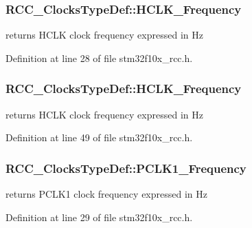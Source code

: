 \subsubsection[{\texorpdfstring{H\+C\+L\+K\+\_\+\+Frequency}{HCLK_Frequency}}]{ R\+C\+C\+\_\+\+Clocks\+Type\+Def\+::\+H\+C\+L\+K\+\_\+\+Frequency}\hypertarget{struct_r_c_c___clocks_type_def_afd09fa4f2e7da560accb159fab2c421b}{}\label{struct_r_c_c___clocks_type_def_afd09fa4f2e7da560accb159fab2c421b}
returns H\+C\+LK clock frequency expressed in Hz 

Definition at line 28 of file stm32f10x\+\_\+rcc.\+h.

\subsubsection[{\texorpdfstring{H\+C\+L\+K\+\_\+\+Frequency}{HCLK_Frequency}}]{ R\+C\+C\+\_\+\+Clocks\+Type\+Def\+::\+H\+C\+L\+K\+\_\+\+Frequency}\hypertarget{struct_r_c_c___clocks_type_def_a41b9859d33954117daf7fab42f804b92}{}\label{struct_r_c_c___clocks_type_def_a41b9859d33954117daf7fab42f804b92}
returns H\+C\+LK clock frequency expressed in Hz 

Definition at line 49 of file stm32f10x\+\_\+rcc.\+h.

\subsubsection[{\texorpdfstring{P\+C\+L\+K1\+\_\+\+Frequency}{PCLK1_Frequency}}]{ R\+C\+C\+\_\+\+Clocks\+Type\+Def\+::\+P\+C\+L\+K1\+\_\+\+Frequency}\hypertarget{struct_r_c_c___clocks_type_def_a6346339e3650155409d5c97ad88cdb06}{}\label{struct_r_c_c___clocks_type_def_a6346339e3650155409d5c97ad88cdb06}
returns P\+C\+L\+K1 clock frequency expressed in Hz 

Definition at line 29 of file stm32f10x\+\_\+rcc.\+h.

